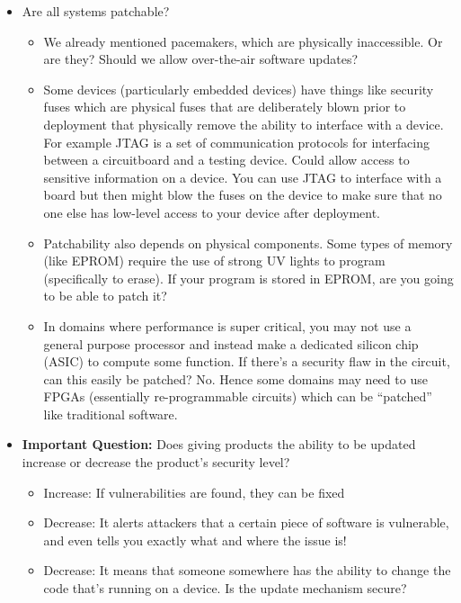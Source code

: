 \documentclass[11pt]{article}
\begin{document}
\begin{itemize}
\begin{itemize}
\begin{itemize}
        \end{itemize}
    \end{itemize}
    \item Are all systems patchable?
    \begin{itemize}
        \item We already mentioned pacemakers, which are physically inaccessible. Or are they? Should we allow over-the-air software updates?
        \item Some devices (particularly embedded devices) have things like security fuses which are physical fuses that are deliberately blown prior to deployment that physically remove the ability to interface with a device. For example JTAG is a set of communication protocols for interfacing between a circuitboard and a testing device. Could allow access to sensitive information on a device. You can use JTAG to interface with a board but then might blow the fuses on the device to make sure that no one else has low-level access to your device after deployment.
        \item Patchability also depends on physical components. Some types of memory (like EPROM) require the use of strong UV lights to program (specifically to erase). If your program is stored in EPROM, are you going to be able to patch it?
        \item In domains where performance is super critical, you may not use a general purpose processor and instead make a dedicated silicon chip (ASIC) to compute some function. If there's a security flaw in the circuit, can this easily be patched? No. Hence some domains may need to use FPGAs (essentially re-programmable circuits) which can be ``patched'' like traditional software.
    \end{itemize}
    \item {\bf Important Question:} Does giving products the ability to be updated increase or decrease the product's security level?
    \begin{itemize}
        \item Increase: If vulnerabilities are found, they can be fixed
        \item Decrease: It alerts attackers that a certain piece of software is vulnerable, and even tells you exactly what and where the issue is!
        \item Decrease: It means that someone somewhere has the ability to change the code that's running on a device. Is the update mechanism secure?
        \begin{itemize}

\end{itemize}
\end{itemize}
\end{itemize}
\end{document}
